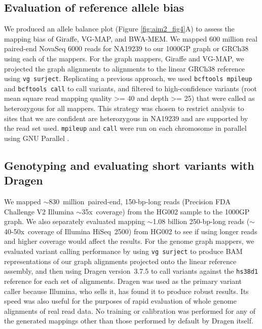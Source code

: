 \documentclass[11pt]{ucscthesis}
\begin{document}
\subsection{Evaluation of reference allele bias}
\label{subsec:srgiraffe_allelebias}
We produced an allele balance plot (Figure \ref{fig:aim2_fig4}A) to assess the mapping bias of Giraffe, VG-MAP, and BWA-MEM.
We mapped 600 million real paired-end NovaSeq 6000 reads for NA19239 to our 1000GP graph or GRCh38 using each of the mappers.
For the graph mappers, Giraffe and VG-MAP, we projected the graph alignments to alignments to the linear GRCh38 reference using \texttt{vg surject}.
Replicating a previous approach\cite{crysnanto_bovine_2020}, we used \texttt{bcftools mpileup} and \texttt{bcftools call}\cite{li_samtools_2011} to call variants, and filtered to high-confidence variants (root mean square read mapping quality >= 40 and depth >= 25) that were called as heterozygous for all mappers.
This strategy was chosen to restrict analysis to sites that we are confident are heterozygous in NA19239 and are supported by the read set used.
\texttt{mpileup} and \texttt{call} were run on each chromosome in parallel using GNU Parallel \cite{Tange2011a}.


\subsection{Genotyping and evaluating short variants with Dragen}
\label{subsec:dragen}

We mapped $\sim$830~million~paired-end, 150-bp-long reads (Precision FDA Challenge V2 Illumina $\sim$35x~coverage) from the HG002 sample to the 1000GP graph.
We also separately evaluated mapping $\sim$1.08 billion 250-bp-long reads ($\sim$40-50x~coverage of Illumina HiSeq~2500) from HG002 to see if using longer reads and higher coverage would affect the results.
For the genome graph mappers, we evaluated variant calling performance by using \texttt{vg~surject} to produce BAM representations of our graph alignments projected onto the linear reference assembly, and then using Dragen version~3.7.5 to call variants against the \texttt{hs38d1} reference for each set of alignments.
Dragen was used as the primary variant caller because Illumina, who sells it, has found it to produce robust results\cite{illumina_dragen_2019,illumina_dragen_pfda_2017,illumina_dragen_pfda_2020}.
Its speed was also useful for the purposes of rapid evaluation of whole genome alignments of real read data.
No training or calibration was performed for any of the generated mappings other than those performed by default by Dragen itself.
\end{document}
